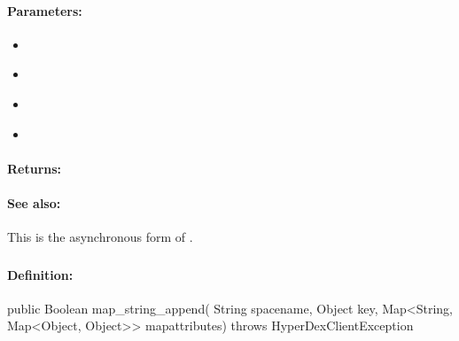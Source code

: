 \paragraph{Parameters:}
\begin{itemize}[noitemsep]
\item {}\\

\item {}\\

\item {}\\

\item {}\\

\end{itemize}

\paragraph{Returns:}


\paragraph{See also:}  This is the asynchronous form of .

\pagebreak
\subsubsection{}
\label{api:java:map_string_append}


\paragraph{Definition:}
\begin{javacode}
public Boolean map_string_append(
        String spacename,
        Object key,
        Map<String, Map<Object, Object>> mapattributes) throws HyperDexClientException
\end{javacode}

